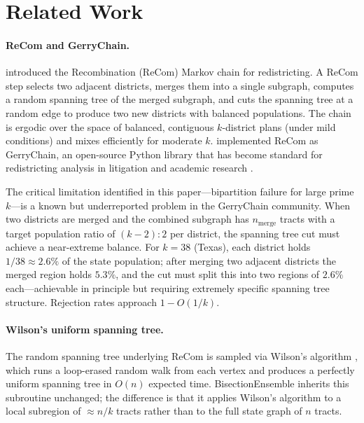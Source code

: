 \section{Related Work}
\label{sec:related}

\paragraph{ReCom and GerryChain.}
\citet{deford2021recombination} introduced the Recombination (ReCom) Markov chain
for redistricting. A ReCom step selects two adjacent districts, merges them into
a single subgraph, computes a random spanning tree of the merged subgraph,
and cuts the spanning tree at a random edge to produce two new districts with
balanced populations. The chain is ergodic over the space of balanced, contiguous
$k$-district plans (under mild conditions) and mixes efficiently for moderate $k$.
\citet{duchin2019gerrychain} implemented ReCom as GerryChain, an open-source
Python library that has become standard for redistricting analysis in litigation
and academic research \citep{herschlag2020quantifying, chikina2017assessing}.

The critical limitation identified in this paper---bipartition failure for large
prime $k$---is a known but underreported problem in the GerryChain community.
When two districts are merged and the combined subgraph has $n_{\text{merge}}$
tracts with a target population ratio of $(k-2):2$ per district, the spanning
tree cut must achieve a near-extreme balance. For $k=38$ (Texas), each district
holds $1/38 \approx 2.6\%$ of the state population; after merging two adjacent
districts the merged region holds $5.3\%$, and the cut must split this into two
regions of $2.6\%$ each---achievable in principle but requiring extremely
specific spanning tree structure. Rejection rates approach $1 - O(1/k)$.

\paragraph{Wilson's uniform spanning tree.}
The random spanning tree underlying ReCom is sampled via Wilson's algorithm
\citep{wilson1996generating}, which runs a loop-erased random walk from each
vertex and produces a perfectly uniform spanning tree in $O(n)$ expected time.
BisectionEnsemble inherits this subroutine unchanged; the difference is that
it applies Wilson's algorithm to a local subregion of $\approx n/k$ tracts
rather than to the full state graph of $n$ tracts.

